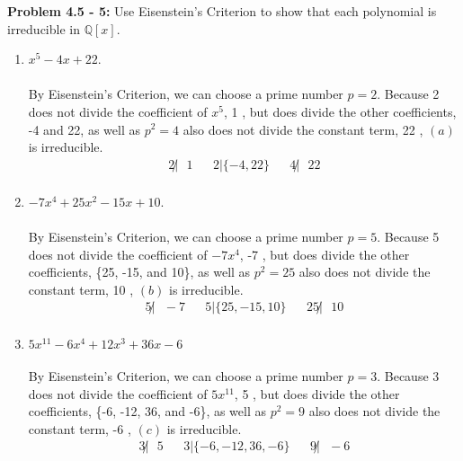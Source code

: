 \documentclass[12pt]{article}
\begin{document}
\newpage 

\noindent \textbf{Problem 4.5 - 5: }Use Eisenstein's Criterion to show that each polynomial is irreducible in $\mathbb{Q}[x]$.
	\begin{enumerate}[label = (\alph*)]
		\item $x^5 - 4x + 22$.
		\\ \\
		By Eisenstein's Criterion, we can choose a prime number $p = 2$.  Because 2 does not divide the coefficient of $x^5$, 1 , but does divide the other coefficients, -4 and 22, as well as $p^2 = 4$ also does not divide the constant term, 22 , $(a)$ is irreducible.
		\begin{align*}
			2 \not | \text{ }1 && 2 | \{-4, 22\} && 4 \not | \text{ }22 \\
		\end{align*}
		\item $-7x^4 + 25x^2 - 15x + 10$.
		\\ \\
		By Eisenstein's Criterion, we can choose a prime number $p = 5$.  Because 5 does not divide the coefficient of $-7x^4$, -7 , but does divide the other coefficients, \{25, -15, and 10\}, as well as $p^2 = 25$ also does not divide the constant term, 10 , $(b)$ is irreducible.
		\begin{align*}
		5 \not | \text{ }-7 && 5 | \{25, -15, 10\} && 25 \not | \text{ } 10 \\
		\end{align*}
		\item $5x^{11} - 6x^4 + 12x^3 + 36x - 6$
		\\ \\
		By Eisenstein's Criterion, we can choose a prime number $p = 3$.  Because 3 does not divide the coefficient of $5x^{11}$, 5 , but does divide the other coefficients, \{-6, -12, 36, and -6\}, as well as $p^2 = 9$ also does not divide the constant term, -6 , $(c)$ is irreducible.
		\begin{align*}
		3 \not | \text{ }5 && 3 | \{-6, -12, 36, -6\} && 9 \not | \text{ } -6 \\
		\end{align*}
	\end{enumerate}
\end{document}
